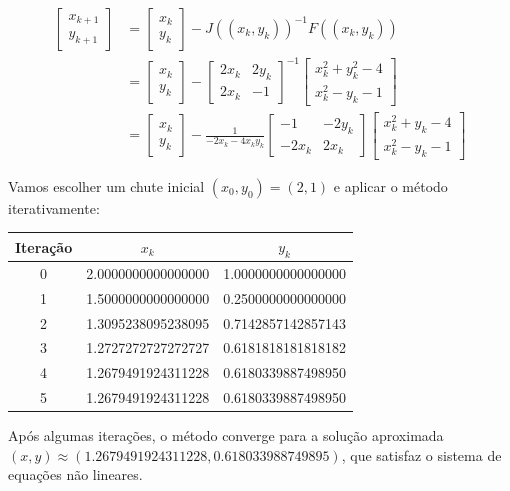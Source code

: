 \begin{align*}
        \begin{bmatrix}
            x_{k+1} \\
            y_{k+1}
        \end{bmatrix} 
        &=
        \begin{bmatrix}
            x_k \\
            y_k
        \end{bmatrix} - J((x_k, y_k))^{-1} F((x_k, y_k)) \\[12pt]
        &=
        \begin{bmatrix}
            x_k \\
            y_k
        \end{bmatrix} - 
        \begin{bmatrix}
            2x_k & 2y_k \\
            2x_k & -1
        \end{bmatrix}^{-1} 
        \begin{bmatrix}
            x_k^2 + y_k^2 - 4 \\
            x_k^2 - y_k - 1
        \end{bmatrix}\\[12pt]
        &=
        \begin{bmatrix}
            x_k \\
            y_k
        \end{bmatrix} - 
        \frac{1}{-2x_k - 4 x_k y_k }
        \begin{bmatrix}
            -1 & -2y_k \\
            -2x_k & 2x_k
        \end{bmatrix} 
        \begin{bmatrix}
            x_k^2 + y_k - 4 \\
            x_k^2 - y_k - 1
        \end{bmatrix}
\end{align*}

Vamos escolher um chute inicial \( (x_0, y_0) = (2, 1) \) e aplicar o método iterativamente:
\begin{center}
\begin{tabular}{|c|c|c|}
\hline
Iteração & $x_k$ & $y_k$ \\
\hline
0 & 2.0000000000000000 & 1.0000000000000000 \\
1 & 1.5000000000000000 & 0.2500000000000000 \\
2 & 1.3095238095238095 & 0.7142857142857143 \\
3 & 1.2727272727272727 & 0.6181818181818182 \\
4 & 1.2679491924311228 & 0.6180339887498950 \\
5 & 1.2679491924311228 & 0.6180339887498950 \\
\hline
\end{tabular}
\end{center}
Após algumas iterações, o método converge para a solução aproximada \( (x, y) \approx (1.2679491924311228, 0.618033988749895) \), que satisfaz o sistema de equações não lineares.

